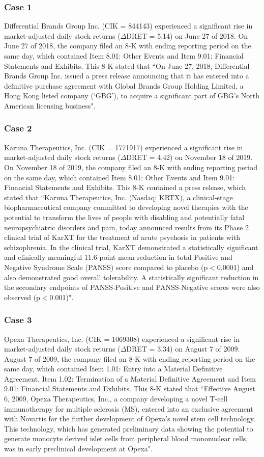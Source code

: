 \subsubsection*{Case 1}
Differential Brands Group Inc. (CIK = 844143) experienced a significant rise in market-adjusted daily stock returns ($\Delta$DRET = 5.14) on June 27 of 2018. On June 27 of 2018, the company filed an 8-K with ending reporting period on the same day, which contained Item 8.01: Other Events and Item 9.01: Financial Statements and Exhibits. This 8-K stated that ``On June 27, 2018, Differential Brands Group Inc. issued a press release announcing that it has entered into a definitive purchase agreement with Global Brands Group Holding Limited, a Hong Kong listed company (`GBG'), to acquire a significant part of GBG’s North American licensing business".
\subsubsection*{Case 2}
Karuna Therapeutics, Inc. (CIK = 1771917) experienced a significant rise in market-adjusted daily stock returns ($\Delta$DRET = 4.42) on November 18 of 2019. On November 18 of 2019, the company filed an 8-K with ending reporting period on the same day, which contained Item 8.01: Other Events and Item 9.01: Financial Statements and Exhibits. This 8-K contained a press release, which stated that ``Karuna Therapeutics, Inc. (Nasdaq: KRTX), a clinical-stage biopharmaceutical company committed to developing novel therapies with the potential to transform the lives of people with disabling and potentially fatal neuropsychiatric disorders and pain, today announced results from its Phase 2 clinical trial of KarXT for the treatment of acute psychosis in patients with schizophrenia. In the clinical trial, KarXT demonstrated a statistically significant and clinically meaningful 11.6 point mean reduction in total Positive and Negative Syndrome Scale (PANSS) score compared to placebo (p$<$0.0001) and also demonstrated good overall tolerability. A statistically significant reduction in the secondary endpoints of PANSS-Positive and PANSS-Negative scores were also observed (p$<$0.001)". 
\subsubsection*{Case 3}
Opexa Therapeutics, Inc. (CIK = 1069308) experienced a significant rise in market-adjusted daily stock returns ($\Delta$DRET = 3.34) on August 7 of 2009. August 7 of 2009, the company filed an 8-K with ending reporting period on the same day, which contained Item 1.01: Entry into a Material Definitive Agreement, Item 1.02: Termination of a Material Definitive Agreement and Item 9.01: Financial Statements and Exhibits. This 8-K stated that ``Effective August 6, 2009, Opexa Therapeutics, Inc., a company developing a novel T-cell immunotherapy for multiple sclerosis (MS), entered into an exclusive agreement with Novartis for the further development of Opexa’s novel stem cell technology. This technology, which has generated preliminary data showing the potential to generate monocyte derived islet cells from peripheral blood mononuclear cells, was in early preclinical development at Opexa". 
